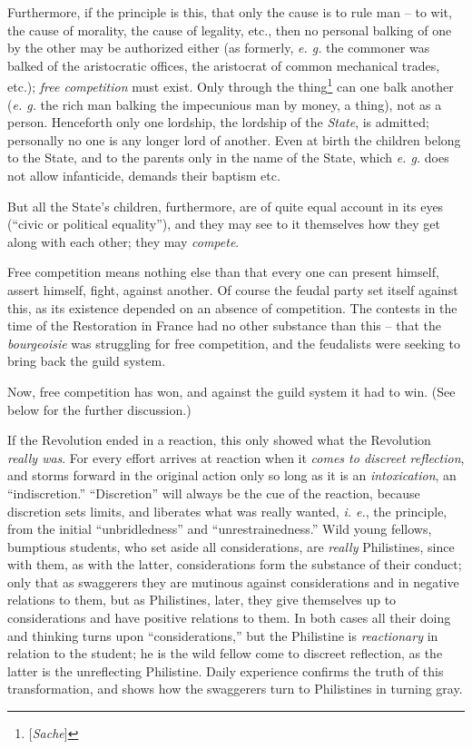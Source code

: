 \documentclass[12pt,a4paper]{book}
\begin{document}
Furthermore, if the principle is this, that only the cause is to rule man -- 
to wit, the cause of morality, the cause of legality, etc., then no personal 
balking of one by the other may be authorized either (as formerly, \textit{e. 
g.} the commoner was balked of the aristocratic offices, the aristocrat of 
common mechanical trades, etc.); \textit{free competition} must exist. Only 
through the thing\footnote{[\textit{Sache}]} can one balk another (\textit{e. 
g.} the rich man balking the impecunious man by money, a thing), not as a 
person. Henceforth only one lordship, the lordship of the \textit{State}, is 
admitted; personally no one is any longer lord of another. Even at birth the 
children belong to the State, and to the parents only in the name of the 
State, which \textit{e. g.} does not allow infanticide, demands their baptism 
etc.

But all the State's children, furthermore, are of quite equal account in its 
eyes (``civic or political equality''), and they may see to it themselves 
how they get along with each other; they may \textit{compete}.

Free competition means nothing else than that every one can present himself, 
assert himself, fight, against another. Of course the feudal party set itself 
against this, as its existence depended on an absence of competition. The 
contests in the time of the Restoration in France had no other substance than 
this -- that the \textit{bourgeoisie} was struggling for free competition, and 
the feudalists were seeking to bring back the guild system.

Now, free competition has won, and against the guild system it had to win. 
(See below for the further discussion.)

If the Revolution ended in a reaction, this only showed what the Revolution 
\textit{really was}. For every effort arrives at reaction when it 
\textit{comes to discreet reflection}, and storms forward in the original 
action only so long as it is an \textit{intoxication}, an ``indiscretion.'' 
``Discretion'' will always be the cue of the reaction, because discretion 
sets limits, and liberates what was really wanted, \textit{i. e.}, the 
principle, from the initial ``unbridledness'' and ``unrestrainedness.'' 
Wild young fellows, bumptious students, who set aside all considerations, are 
\textit{really} Philistines, since with them, as with the latter, 
considerations form the substance of their conduct; only that as swaggerers 
they are mutinous against considerations and in negative relations to them, 
but as Philistines, later, they give themselves up to considerations and have 
positive relations to them. In both cases all their doing and thinking turns 
upon ``considerations,'' but the Philistine is \textit{reactionary} in 
relation to the student; he is the wild fellow come to discreet reflection, as 
the latter is the unreflecting Philistine. Daily experience confirms the truth 
of this transformation, and shows how the swaggerers turn to Philistines in 
turning gray.
\end{document}
